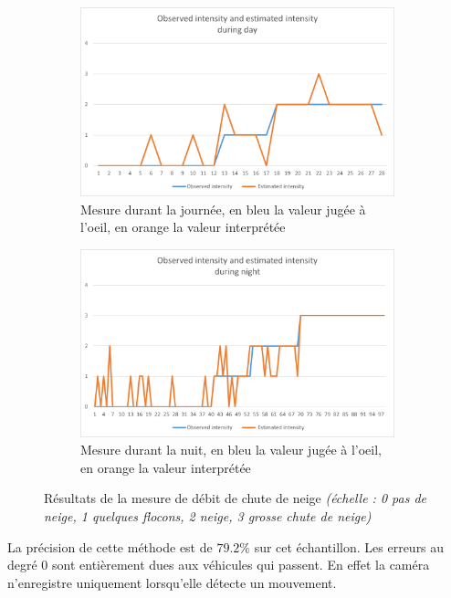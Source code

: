\begin{figure}[H]
\begin{subfigure}{.45\textwidth}
        \includegraphics[width=\linewidth]{Images/computer_vision/snowfall/dayResults.png}
        \caption{Mesure durant la journée, en bleu la valeur jugée à l'oeil, en orange la valeur interprétée}
        \label{fig:Snowfall_dayResults}
    \end{subfigure}
    \hfill
    \begin{subfigure}{.45\textwidth}
        \includegraphics[width=\linewidth]{Images/computer_vision/snowfall/nightResults.png}
        \caption{Mesure durant la nuit, en bleu la valeur jugée à l'oeil, en orange la valeur interprétée}
        \label{fig:Snowfall_nightResults}
    \end{subfigure}
    \caption{Résultats de la mesure de débit de chute de neige \emph{(échelle : 0 pas de neige, 1 quelques flocons, 2 neige, 3 grosse chute de neige)}}
    \label{fig:Snowfall_results}
\end{figure}

\noindent
La précision de cette méthode est de $79.2\%$ sur cet échantillon. Les erreurs au degré 0 sont entièrement dues aux véhicules qui passent.
En effet la caméra n'enregistre uniquement lorsqu'elle détecte un mouvement.

